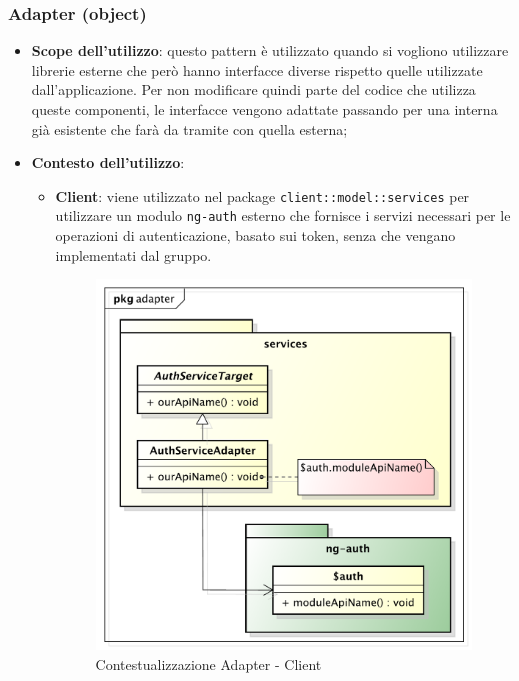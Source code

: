	\subsubsection{Adapter (object)} %
	\label{ssub:adapter_object}
		\begin{itemize}
			\item \textbf{Scope dell'utilizzo}: questo pattern è utilizzato quando si vogliono utilizzare librerie esterne che però hanno interfacce diverse rispetto quelle utilizzate dall'applicazione. Per non modificare quindi parte del codice che utilizza queste componenti, le interfacce vengono adattate passando per una interna già esistente che farà da tramite con quella esterna;
			\item \textbf{Contesto dell'utilizzo}:
				\begin{itemize}
					\item \textbf{Client}: viene utilizzato nel package \texttt{client::model::services} per utilizzare un modulo \texttt{ng-auth} esterno che fornisce i servizi necessari per le operazioni di autenticazione, basato sui token, senza che vengano implementati dal gruppo.
					\begin{figure}[!htbp]
						\centering
						\centerline{\includegraphics[scale=0.55]{./images/design_pattern_client/client_adapter.pdf}}
						\caption{Contestualizzazione Adapter - Client}
					\end{figure}
				\end{itemize}
		\end{itemize}


